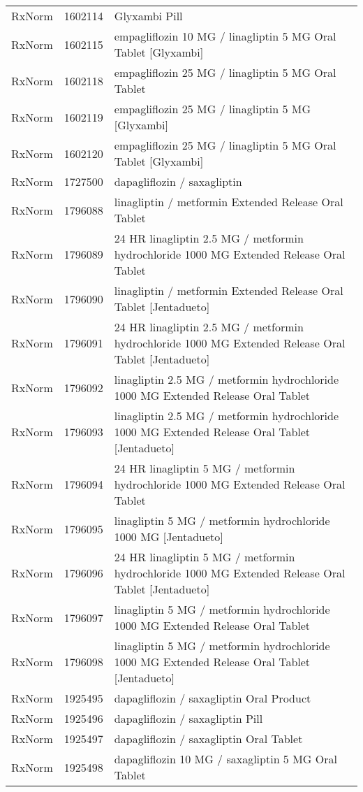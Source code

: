 \begin{longtable}{p{}p{}p{}}
  RxNorm & 1602114 & Glyxambi Pill \\ 
  RxNorm & 1602115 & empagliflozin 10 MG / linagliptin 5 MG Oral Tablet [Glyxambi] \\ 
  RxNorm & 1602118 & empagliflozin 25 MG / linagliptin 5 MG Oral Tablet \\ 
  RxNorm & 1602119 & empagliflozin 25 MG / linagliptin 5 MG [Glyxambi] \\ 
  RxNorm & 1602120 & empagliflozin 25 MG / linagliptin 5 MG Oral Tablet [Glyxambi] \\ 
  RxNorm & 1727500 & dapagliflozin / saxagliptin \\ 
  RxNorm & 1796088 & linagliptin / metformin Extended Release Oral Tablet \\ 
  RxNorm & 1796089 & 24 HR linagliptin 2.5 MG / metformin hydrochloride 1000 MG Extended Release Oral Tablet \\ 
  RxNorm & 1796090 & linagliptin / metformin Extended Release Oral Tablet [Jentadueto] \\ 
  RxNorm & 1796091 & 24 HR linagliptin 2.5 MG / metformin hydrochloride 1000 MG Extended Release Oral Tablet [Jentadueto] \\ 
  RxNorm & 1796092 & linagliptin 2.5 MG / metformin hydrochloride 1000 MG Extended Release Oral Tablet \\ 
  RxNorm & 1796093 & linagliptin 2.5 MG / metformin hydrochloride 1000 MG Extended Release Oral Tablet [Jentadueto] \\ 
  RxNorm & 1796094 & 24 HR linagliptin 5 MG / metformin hydrochloride 1000 MG Extended Release Oral Tablet \\ 
  RxNorm & 1796095 & linagliptin 5 MG / metformin hydrochloride 1000 MG [Jentadueto] \\ 
  RxNorm & 1796096 & 24 HR linagliptin 5 MG / metformin hydrochloride 1000 MG Extended Release Oral Tablet [Jentadueto] \\ 
  RxNorm & 1796097 & linagliptin 5 MG / metformin hydrochloride 1000 MG Extended Release Oral Tablet \\ 
  RxNorm & 1796098 & linagliptin 5 MG / metformin hydrochloride 1000 MG Extended Release Oral Tablet [Jentadueto] \\ 
  RxNorm & 1925495 & dapagliflozin / saxagliptin Oral Product \\ 
  RxNorm & 1925496 & dapagliflozin / saxagliptin Pill \\ 
  RxNorm & 1925497 & dapagliflozin / saxagliptin Oral Tablet \\ 
  RxNorm & 1925498 & dapagliflozin 10 MG / saxagliptin 5 MG Oral Tablet \\ 

\end{longtable}
